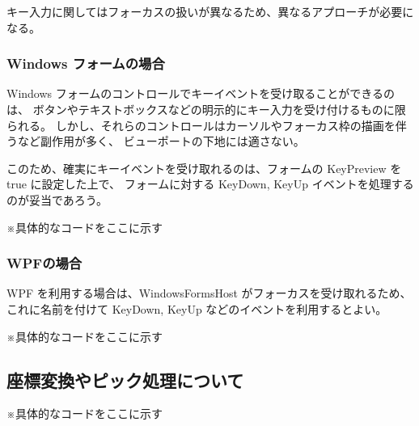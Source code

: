キー入力に関してはフォーカスの扱いが異なるため、異なるアプローチが必要になる。

\subsubsection{Windows フォームの場合}

Windows フォームのコントロールでキーイベントを受け取ることができるのは、
ボタンやテキストボックスなどの明示的にキー入力を受け付けるものに限られる。
しかし、それらのコントロールはカーソルやフォーカス枠の描画を伴うなど副作用が多く、
ビューポートの下地には適さない。

このため、確実にキーイベントを受け取れるのは、フォームの KeyPreview を true に設定した上で、
フォームに対する KeyDown, KeyUp イベントを処理するのが妥当であろう。

※具体的なコードをここに示す

\subsubsection{WPFの場合}

WPF を利用する場合は、WindowsFormsHost がフォーカスを受け取れるため、
これに名前を付けて KeyDown, KeyUp などのイベントを利用するとよい。

※具体的なコードをここに示す

\subsection{座標変換やピック処理について}

※具体的なコードをここに示す
